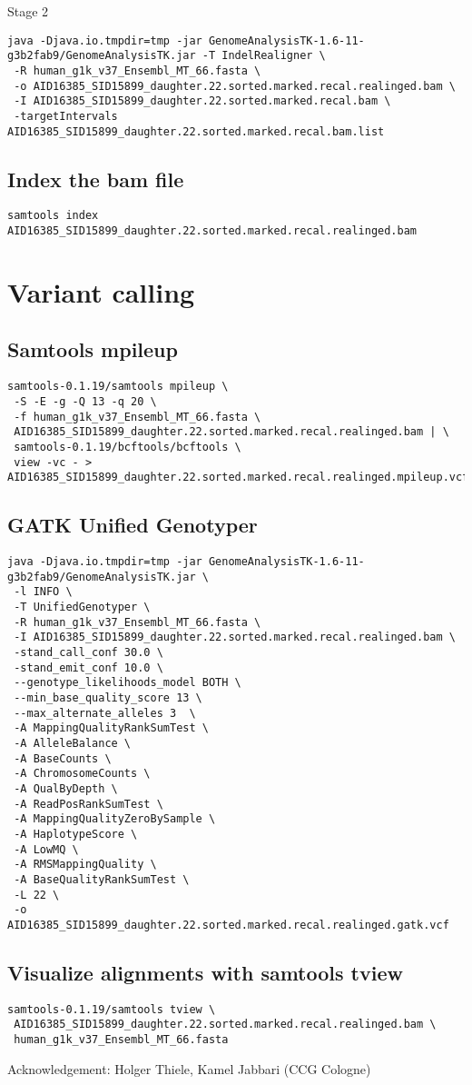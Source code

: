 \documentclass{article}
\begin{document}
Stage 2
\begin{verbatim}
java -Djava.io.tmpdir=tmp -jar GenomeAnalysisTK-1.6-11-g3b2fab9/GenomeAnalysisTK.jar -T IndelRealigner \
 -R human_g1k_v37_Ensembl_MT_66.fasta \
 -o AID16385_SID15899_daughter.22.sorted.marked.recal.realinged.bam \
 -I AID16385_SID15899_daughter.22.sorted.marked.recal.bam \
 -targetIntervals AID16385_SID15899_daughter.22.sorted.marked.recal.bam.list
\end{verbatim}

\subsection{Index the bam file}
\begin{verbatim}
samtools index AID16385_SID15899_daughter.22.sorted.marked.recal.realinged.bam
\end{verbatim}


\section{Variant calling}


\subsection{Samtools mpileup}
\begin{verbatim}
samtools-0.1.19/samtools mpileup \
 -S -E -g -Q 13 -q 20 \
 -f human_g1k_v37_Ensembl_MT_66.fasta \
 AID16385_SID15899_daughter.22.sorted.marked.recal.realinged.bam | \
 samtools-0.1.19/bcftools/bcftools \
 view -vc - > AID16385_SID15899_daughter.22.sorted.marked.recal.realinged.mpileup.vcf
\end{verbatim}

\subsection{ GATK Unified Genotyper}
\begin{verbatim}
java -Djava.io.tmpdir=tmp -jar GenomeAnalysisTK-1.6-11-g3b2fab9/GenomeAnalysisTK.jar \
 -l INFO \
 -T UnifiedGenotyper \
 -R human_g1k_v37_Ensembl_MT_66.fasta \
 -I AID16385_SID15899_daughter.22.sorted.marked.recal.realinged.bam \
 -stand_call_conf 30.0 \
 -stand_emit_conf 10.0 \
 --genotype_likelihoods_model BOTH \
 --min_base_quality_score 13 \
 --max_alternate_alleles 3  \
 -A MappingQualityRankSumTest \
 -A AlleleBalance \
 -A BaseCounts \
 -A ChromosomeCounts \
 -A QualByDepth \
 -A ReadPosRankSumTest \
 -A MappingQualityZeroBySample \
 -A HaplotypeScore \
 -A LowMQ \
 -A RMSMappingQuality \
 -A BaseQualityRankSumTest \
 -L 22 \
 -o AID16385_SID15899_daughter.22.sorted.marked.recal.realinged.gatk.vcf
\end{verbatim} 

\subsection{ Visualize alignments with samtools tview }
\begin{verbatim}
samtools-0.1.19/samtools tview \
 AID16385_SID15899_daughter.22.sorted.marked.recal.realinged.bam \
 human_g1k_v37_Ensembl_MT_66.fasta
\end{verbatim}
Acknowledgement: Holger Thiele, Kamel Jabbari (CCG Cologne)
\end{document}
